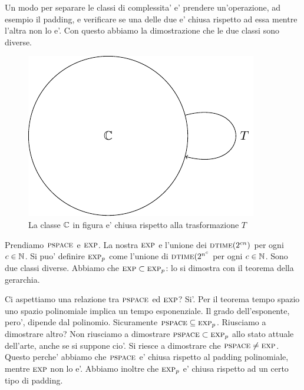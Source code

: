 Un modo per separare le classi di complessita' e' prendere un'operazione, ad esempio il padding, e
verificare se una delle due e' chiusa rispetto ad essa mentre l'altra non lo e'. Con questo abbiamo
la dimostrazione che le due classi sono diverse.

\begin{figure}[h]
    \begin{center}
        \includegraphics{./img/ClosedClass.pdf}    
        \caption{La classe $\mathbb{C}$ in figura e' chiusa rispetto alla trasformazione $T$}
    \end{center}
\end{figure}

Prendiamo $\textsc{pspace}$ e $\textsc{exp}$. La nostra $\textsc{exp}$ e l'unione dei $\textsc{dtime}(2^{cn})$ per ogni $c \in
\mathbb{N}$. Si puo' definire $\textsc{exp}_{p}$ come l'unione di $\textsc{dtime}(2^{n^{c}}$ per ogni $c \in \mathbb{N}$. Sono
due classi diverse. Abbiamo che $\textsc{exp} \subset \textsc{exp}_{p}$: lo si dimostra con il teorema della
gerarchia.

Ci aspettiamo una relazione tra $\textsc{pspace}$ ed $\textsc{exp}$? Si'. Per il teorema tempo spazio uno spazio
polinomiale implica un tempo esponenziale. Il grado dell'esponente, pero', dipende dal polinomio.
Sicuramente $\textsc{pspace} \subseteq \textsc{exp}_{p}$. Riusciamo a dimostrare altro? Non riusciamo a dimostrare
$\textsc{pspace} \subset \textsc{exp}_{p}$ allo stato attuale dell'arte, anche se si suppone cio'. Si riesce a
dimostrare che $\textsc{pspace} \not= \textsc{exp}$. Questo perche' abbiamo che $\textsc{pspace}$ e' chiusa rispetto al
padding polinomiale, mentre $\textsc{exp}$ non lo e'. Abbiamo inoltre che $\textsc{exp}_{p}$ e' chiusa
rispetto ad un certo tipo di padding.


